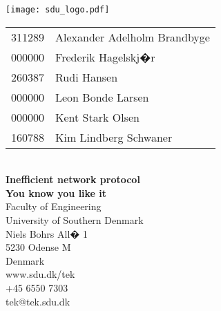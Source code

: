 \begin{titlepage}%
\begin{flushright}
\texttt{[image: sdu\_logo.pdf]}
\end{flushright}
\vspace*{2.7cm}
%
%
\setlength{\extrarowheight}{1.5pt}
\begin{tabular}{@{}l l}
	\textsf{\large{311289}} & \textsf{\large{Alexander Adelholm Brandbyge}}\\
	\textsf{\large{000000}} & \textsf{\large{Frederik Hagelskj�r}}\\
	\textsf{\large{260387}} & \textsf{\large{Rudi Hansen}}\\
	\textsf{\large{000000}} & \textsf{\large{Leon Bonde Larsen}}\\
	\textsf{\large{000000}} & \textsf{\large{Kent Stark Olsen}}\\
	\textsf{\large{160788}} & \textsf{\large{Kim Lindberg Schwaner}}
\end{tabular}
\setlength{\extrarowheight}{0pt}
\vspace*{1.5cm}
\\
\textsf{\Huge{\textbf{\textcolor{FrontpageHeadingColor}{Inefficient network protocol}}}}
\vspace*{0.5cm}
\\
\textsf{\Large{\textbf{\textcolor{FrontpageHeadingColor}{You know you like it}}}}
\vfill
\textsf{\\Faculty of Engineering\\
University of Southern Denmark\\
Niels Bohrs All� 1\\
5230 Odense M\\
Denmark}
\vspace*{10pt}
\\
\textsf{www.sdu.dk/tek\\
+45 6550 7303\\
tek@tek.sdu.dk}
\end{titlepage}%